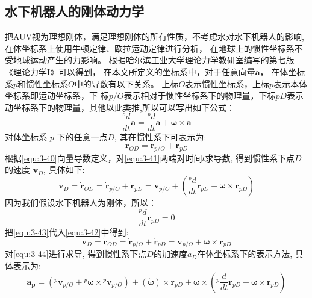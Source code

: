 \subsection{水下机器人的刚体动力学}
把AUV视为理想刚体，满足理想刚体的所有性质，不考虑水对水下机器人的影响,在体坐标系上使用牛顿定律、欧拉运动定律进行分析，
在地球上的惯性坐标系不受地球运动产生的力影响\cite{ref30}。
根据哈尔滨工业大学理论力学教研室编写的第七版《理论力学I》可以得到，
在本文所定义的坐标系中，对于任意向量$\boldsymbol{a}$，
在体坐标系${p}$和惯性坐标系${O}$中的导数有以下关系。
上标$O$表示惯性坐标系，上标$p$表示本体坐标系即运动坐标系，下
标$p/O$表示相对于惯性坐标系下的物理量，下标$pD$表示动坐标系下的物理量，其他以此类推\cite{ref24},所以可以写出如下公式：
\begin{equation}
    \label{equ:3-40}
    \frac{^od}{dt}\boldsymbol{a}=\frac{^pd}{dt}\boldsymbol{a}+\boldsymbol{\omega}\times\boldsymbol{a}
\end{equation}
对体坐标系 ${p}$ 下的任意一点$ D$, 其在惯性系下可表示为:
\begin{equation}
    \label{equ:3-41}
    \boldsymbol{r}_{{OD}}=\boldsymbol{r}_{{p/O}}+\boldsymbol{r}_{{pD}}
\end{equation}
根据\autoref{equ:3-40}向量导数定义，对\autoref{equ:3-41}两端对时间$t$求导数, 得到惯性系下点$D$的速度 $\boldsymbol{v}_D$, 具体如下:
\begin{equation}
    \label{equ:3-42}
    \boldsymbol{ v}_{D}=\boldsymbol{\dot{r}}_{OD}=
    \boldsymbol{\dot{r}}_{p/O}+\boldsymbol{\dot{r}}_{pD}=
    \boldsymbol{v}_{p/O}+\left(\frac{^pd}{dt}\boldsymbol{r}_{pD}+\boldsymbol{\omega}\times\boldsymbol{r}_{pD}\right)
\end{equation}
因为我们假设水下机器人为刚体，所以：
\begin{equation}
    \label{equ:3-43}
    \frac{^pd}{dt}\boldsymbol{r}_{{pD}}=0
\end{equation}
把\autoref{equ:3-43}代入\autoref{equ:3-42}中得到:
\begin{equation}
    \label{equ:3-44}
    \boldsymbol{v}_{D}=\dot{\boldsymbol{r}}_{OD}=\dot{\boldsymbol{r}}_{p/O}+\dot{\boldsymbol{r}}_{pD}=
    \boldsymbol{v}_{p/O}+\boldsymbol{\omega}\times\boldsymbol{r}_{pD}
\end{equation}
对\autoref{equ:3-44}进行求导, 得到惯性系下点$D$的加速度$a_D$在体坐标系下的表示方法, 具体表示为:
\begin{equation}
    \boldsymbol{a_{{p}}}=\left({}^{{p}}\dot{\boldsymbol{v}}_{{p/O}}
    +{}^{{p}}\boldsymbol{\omega}\times{}^{{p}}\boldsymbol{v}_{{p/O}}\right)
    +\left(\dot{ \boldsymbol{\omega}}\right)\times\boldsymbol{r}_{{pD}}
    +\boldsymbol{\omega}\times\left({}^{p}\frac{d}{dt}\boldsymbol{r}_{{pD}}
    +\boldsymbol{\omega}\times\boldsymbol{r}_{{pD}}\right)
\end{equation}
